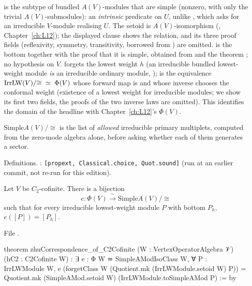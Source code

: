 \begin{dictionary}
 is the subtype of bundled $A(V)$-modules that are simple (nonzero, with only the
trivial $A(V)$-submodules): an \emph{intrinsic} predicate on $U$, unlike , which asks for an irreducible
$V$-module realising $U$. The setoid is $A(V)$-isomorphism (, Chapter~\ref{ch:L12}); the displayed
 clause shows the relation, and its three proof fields (reflexivity, symmetry, transitivity, borrowed from
) are omitted.  is the bottom  together with the proof
that it is simple, obtained from  and the theorem ; no hypothesis on
$V$.  forgets the lowest weight $h$ (an irreducible bundled lowest-weight module \emph{is} an irreducible
ordinary module, );  is the equivalence
$\mathrm{Irr}\mathrm{LW}(V)/{\cong}\;\simeq\;\Phi(V)$ whose forward map is  and whose inverse chooses the
conformal weight (existence of a lowest weight for irreducible modules; we show its first two fields, the proofs of the two
inverse laws are omitted). This identifies the domain  of the headline with Chapter~\ref{ch:L12}'s
$\Phi(V)$.
\end{dictionary}

\begin{physics}
$\mathrm{Simple}A(V)/{\cong}$ is the list of \emph{allowed} irreducible primary multiplets, computed from the zero-mode algebra
alone, before asking whether each of them generates a sector.
\end{physics}

\begin{status}
Definitions. : \texttt{[propext, Classical.choice, Quot.sound]} (run at an earlier commit, not re-run for this edition).
\end{status}

\begin{theorem}\label{l13:thm:zhucorr}
Let $V$ be $C_2$-cofinite. There is a bijection
\begin{equation*}
  e:\Phi(V)\xrightarrow{\ \sim\ }\mathrm{Simple}A(V)/{\cong}
\end{equation*}
such that for every irreducible lowest-weight module $P$ with bottom $P_h$, $e([P])=[P_h]$.
\end{theorem}
\noindent File .
\begin{leancode}
theorem zhuCorrespondence_of_C2Cofinite (W : VertexOperatorAlgebra 𝒱) (hC2 : C2Cofinite W) :
    ∃ e : Φ W ≃ SimpleAModIsoClass W, ∀ P : IrrLWModule W,
      e (forgetClass W (Quotient.mk (IrrLWModule.setoid W) P)) =
        Quotient.mk (SimpleAMod.setoid W) (IrrLWModule.toSimpleAMod P) := by
\end{leancode}


